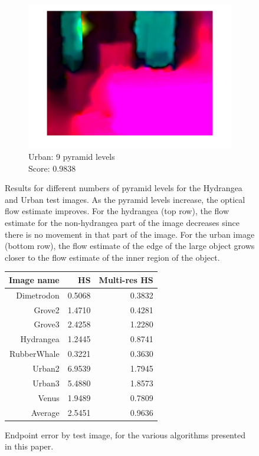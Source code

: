 \documentclass[10pt,twocolumn,letterpaper]{article}
\begin{document}
\begin{figure}[t]
\begin{subfigure}[b]{0.3\textwidth}
    \end{subfigure} \hfill
    \begin{subfigure}[b]{0.3\textwidth}
    	\centering
        \includegraphics[width=\textwidth] {urban2_9levels.jpg}
        \caption{Urban: 9 pyramid levels \\ Score: 0.9838}
        \label{fig:urban9}
    \end{subfigure}
	\caption{Results for different numbers of pyramid levels for the Hydrangea and Urban test images. As the pyramid levels increase, the optical flow estimate improves. For the hydrangea (top row), the flow estimate for the non-hydrangea part of the image decreases since there is no movement in that part of the image. For the urban image (bottom row), the flow estimate of the edge of the large object grows closer to the flow estimate of the inner region of the object. }
	\label{fig:multires}
\end{figure}

\begin{figure}
\begin{tabular} {|r | r | r|}
\hline
Image name & HS & Multi-res HS \\
\hline 
Dimetrodon & 0.5068 &  0.3832 \\
Grove2 & 1.4710 & 0.4281 \\
Grove3 &  2.4258 & 1.2280 \\
Hydrangea & 1.2445 & 0.8741 \\
RubberWhale & 0.3221 & 0.3630 \\
Urban2 & 6.9539 & 1.7945 \\
Urban3 & 5.4880 & 1.8573 \\
Venus & 1.9489 & 0.7809 \\
\hline
Average & 2.5451 & 0.9636 \\
\hline

\end{tabular}

\caption{Endpoint error by test image, for the various algorithms presented in this paper.}
\label{fig:table}
\end{figure}
\end{document}
